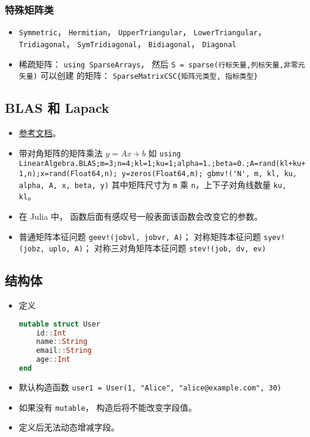 \subsubsection{特殊矩阵类}
\begin{itemize}
\item \verb`Symmetric`， \verb`Hermitian`， \verb`UpperTriangular`， \verb`LowerTriangular`， \verb`Tridiagonal`， \verb`SymTridiagonal`， \verb`Bidiagonal`， \verb`Diagonal`
\item 稀疏矩阵： \verb`using SparseArrays`， 然后 \verb`S = sparse(行标矢量,列标矢量,非零元矢量)` 可以创建 的矩阵： \verb`SparseMatrixCSC{矩阵元类型, 指标类型}`
\end{itemize}

\subsection{BLAS 和 Lapack}
\begin{itemize}
\item \href{https://docs.julialang.org/en/v1/stdlib/LinearAlgebra/}{参考文档}。
\item 带对角矩阵的矩阵乘法 $y = Ax+b$ 如 \verb`using LinearAlgebra.BLAS;m=3;n=4;kl=1;ku=1;alpha=1.;beta=0.;A=rand(kl+ku+1,n);x=rand(Float64,n); y=zeros(Float64,m); gbmv!('N', m, kl, ku, alpha, A, x, beta, y)` 其中矩阵尺寸为 \verb`m` 乘 \verb`n`，上下子对角线数量 \verb`ku, kl`。
\item 在 Julia 中， 函数后面有感叹号一般表面该函数会改变它的参数。
\item 普通矩阵本征问题 \verb`geev!(jobvl, jobvr, A)`； 对称矩阵本征问题 \verb`syev!(jobz, uplo, A)`； 对称三对角矩阵本征问题 \verb`stev!(job, dv, ev)`
\end{itemize}

\subsection{结构体}
\begin{itemize}
\item 定义
\begin{lstlisting}[language=julia]
mutable struct User
    id::Int
    name::String
    email::String
    age::Int
end
\end{lstlisting}
\item 默认构造函数 \verb`user1 = User(1, "Alice", "alice@example.com", 30)`
\item 如果没有 \verb`mutable`， 构造后将不能改变字段值。
\item 定义后无法动态增减字段。
\end{itemize}

